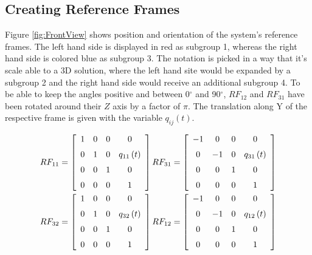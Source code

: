 \subsection{Creating Reference Frames}
Figure \ref{fig:FrontView} shows position and orientation of the system's reference frames. The left hand side is displayed in red as subgroup 1, whereas the right hand side is colored blue as subgroup 3. The notation is picked in a way that it's scale able to a 3D solution, where the left hand site would be expanded by a subgroup 2 and the right hand side would receive an additional subgroup 4.\newline
To be able to keep the angles positive and between 0$^{\circ}$ and 90$^{\circ}$, $RF_{12}$ and $RF_{31}$ have been rotated around their $Z$ axis by a factor of $\pi$. The translation along Y of the respective frame is given with the variable $q_{ij}\left( t \right)$.

\begin{align*}
    RF_{11} =  \left[ \begin {array}{cccc} 1&0&0&0\\ \noalign{\medskip}0&1&0&q_{11}\left( t \right)
\\ \noalign{\medskip}0&0&1&0\\ \noalign{\medskip}0&0&0&1\end {array}
 \right] 
  RF_{31} =\left[ \begin {array}{cccc} -1&0&0&0\\ \noalign{\medskip}0&-1&0&q_{31
} \left( t \right) \\ \noalign{\medskip}0&0&1&0\\ \noalign{\medskip}0&0
&0&1\end {array} \right]  \\
    RF_{32} =  \left[ \begin {array}{cccc} 1&0&0&0\\ \noalign{\medskip}0&1&0&q_{32}
 \left( t \right) \\ \noalign{\medskip}0&0&1&0\\ \noalign{\medskip}0&0
&0&1\end {array} \right]
 RF_{12} =  \left[ \begin {array}{cccc} -1&0&0&0\\ \noalign{\medskip}0&-1&0&q_{12
} \left( t \right) \\ \noalign{\medskip}0&0&1&0\\ \noalign{\medskip}0&0
&0&1\end {array} \right]
\end{align*}


